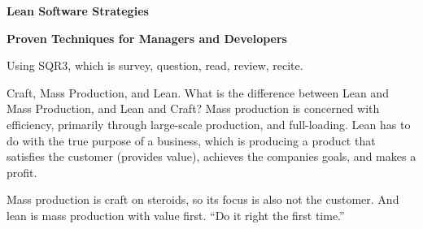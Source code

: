


\centerline{\bf Lean Software Strategies}
\smallskip
\centerline{\bf Proven Techniques for Managers and Developers}
\bigskip
Using SQR3, which is survey, question, read, review, recite.
\bigskip
{}

 Craft, Mass Production, and Lean.
 What is the difference between Lean and Mass Production, and Lean and Craft?
Mass production is concerned with efficiency, primarily through large-scale production, and full-loading.
Lean has to do with the true purpose of a business, which is producing a product that satisfies the customer (provides
value), achieves the companies goals, and makes a profit.

Mass production is craft on steroids, so its focus is also not the customer.
And lean is mass production with value first. ``Do it right the first time.''

\bye
